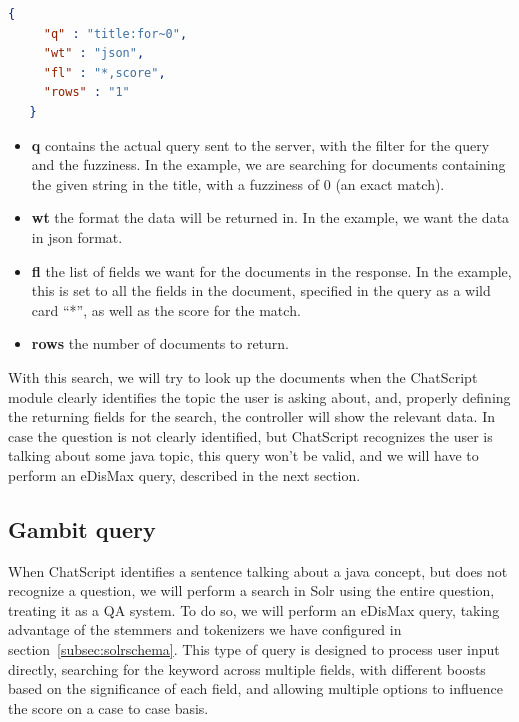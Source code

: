 \begin{center} 
  \begin{lstlisting}[language=json, caption=Example json query for Solr, label=listing:solrquery1]
   {
     "q" : "title:for~0",
     "wt" : "json",
     "fl" : "*,score",
     "rows" : "1"
   }  
  \end{lstlisting}
\end{center}

\begin{itemize}
 \item \textbf{q} contains the actual query sent to the server, with the filter for the query and the fuzziness. In the example, we are searching for documents containing the given string in the title, with a fuzziness of 0 (an exact match).
 \item \textbf{wt} the format the data will be returned in. In the example, we want the data in json format.
 \item \textbf{fl} the list of fields we want for the documents in the response. In the example, this is set to all the fields in the document, specified in the query as a wild card ``*'', as well as the score for the match.
 \item \textbf{rows} the number of documents to return.
\end{itemize}

With this search, we will try to look up the documents when the ChatScript module clearly identifies the topic the user is asking about, and, properly defining the returning fields for the search, the controller will show the relevant data. In case the question is not clearly identified, but ChatScript recognizes the user is talking about some java topic, this query won't be valid, and we will have to perform an \ac{eDisMax} query, described in the next section.

\subsection{Gambit query}
\label{subsec:solrgambit}

When ChatScript identifies a sentence talking about a java concept, but does not recognize a question, we will perform a search in Solr using the entire question, treating it as a \ac{QA} system. To do so, we will perform an \ac{eDisMax} query, taking advantage of the stemmers and tokenizers we have configured in section~\ref{subsec:solrschema}. This type of query is designed to process user input directly, searching for the keyword across multiple fields, with different boosts based on the significance of each field, and allowing multiple options to influence the score on a case to case basis.

